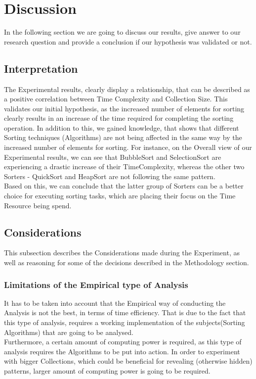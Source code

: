 \documentclass[]{report}
\begin{document}
\section{Discussion}
In the following section we are going to discuss our results, give answer to our research question and provide a conclusion if our hypothesis was validated or not.
\subsection{Interpretation}
The Experimental results, clearly display a relationship, that can be described as a  positive correlation between Time Complexity and Collection Size. This validates our initial hypothesis, as the increased number of elements for sorting clearly results in an increase of the time required for completing the sorting operation. In addition to this, we gained knowledge, that shows that different Sorting techniques (Algorithms) are not being affected in the same way by the increased number of elements for sorting. For instance, on the Overall view of our Experimental results, we can see that BubbleSort and SelectionSort are experiencing a drastic increase of their TimeComplexity, whereas the other two Sorters - QuickSort and HeapSort are not following the same pattern.\\
Based on this, we can conclude that the latter group of Sorters can be a better choice for executing sorting tasks, which are placing their focus on the Time Resource being spend.
\subsection{Considerations}
This subsection describes the Considerations made during the Experiment, as well as reasoning for some of the decisions described in the Methodology section.
\subsubsection{Limitations of the Empirical type of Analysis}
It has to be taken into account that the Empirical way of conducting the Analysis is not the best, in terms of time efficiency. That is due to the fact that this type of analysis, requires a working implementation of the subjects(Sorting Algorithms) that are going to be analysed. \\
Furthermore, a certain amount of computing power is required, as this type of analysis requires the Algorithms to be put into action. In order to experiment with bigger Collections, which could be beneficial for revealing (otherwise hidden) patterns, larger amount of computing power is going to be required. 
\end{document}
